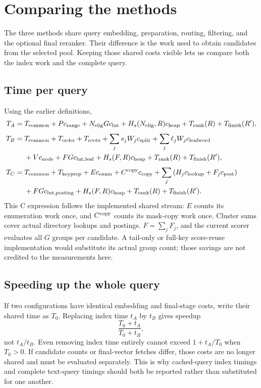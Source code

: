\section{Comparing the methods}
\label{sec:comparison}
The three methods share query embedding, preparation, routing, filtering, and the optional
final reranker. Their difference is the work used to obtain candidates from the selected pool.
Keeping those shared costs visible lets us compare both the index work and the complete query.

\subsection{Time per query}
Using the earlier definitions,
\begin{align}
T_A={}&T_{\mathrm{common}}+P c_{\rm range}
 +N_{\mathrm{elig}} Gc_{\rm lut}+H_s(N_{\mathrm{elig}},R)c_{\rm heap}
 +T_{\rm rank}(R)+T_{\mathrm{finish}}(R'),\label{eq:final-A}\\[3pt]
T_B={}&T_{\mathrm{common}}+T_{\rm order}+T_{\rm roots}
 +\sum_j s_jW_jc_{\rm split}+\sum_j\ell_jW_jc_{\rm leafword}\notag\\
 &+Vc_{\rm node}+FGc_{\rm lut,leaf}
 +H_s(F,R)c_{\rm heap}+T_{\rm rank}(R)+T_{\mathrm{finish}}(R'),\label{eq:final-B}\\[3pt]
T_C={}&T_{\mathrm{common}}+T_{\rm keyprep}+E c_{\rm enum}+C^{\rm copy}c_{\rm copy}
 +\sum_j\left(H_jc_{\rm lookup}+F_jc_{\rm post}\right)\notag\\
 &+FGc_{\rm lut,posting}+H_s(F,R)c_{\rm heap}
 +T_{\rm rank}(R)+T_{\mathrm{finish}}(R').\label{eq:final-C}
\end{align}
This C expression follows the implemented shared stream: $E$ counts its enumeration work once,
and $C^{\rm copy}$ counts its mask-copy work once. Cluster sums cover actual directory lookups
and postings. $F=\sum_jF_j$, and the current scorer evaluates all $G$ groups per candidate.
A tail-only or full-key score-reuse implementation would substitute its actual group count;
those savings are not credited to the measurements here.

\subsection{Speeding up the whole query}
If two configurations have identical embedding and final-stage costs, write their shared time
as $T_0$. Replacing index time $t_A$ by $t_B$ gives speedup
\[
\frac{T_0+t_A}{T_0+t_B},
\]
not $t_A/t_B$. Even removing index time entirely cannot exceed $1+t_A/T_0$ when $T_0>0$.
If candidate counts or final-vector fetches differ, those costs are no longer shared and must
be evaluated separately. This is why cached-query index timings and complete text-query timings
should both be reported rather than substituted for one another.

